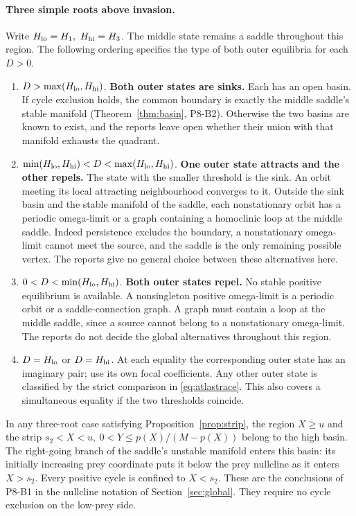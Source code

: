 \documentclass[12pt,a4paper,twoside,fleqn]{article}
\theoremstyle{journal}
\newcommand{\claim}[1]{{\normalfont\bfseries\boldmath #1}}
\begin{document}
\paragraph{Three simple roots above invasion.}
Write \(H_{\rm lo}=H_1,\ H_{\rm hi}=H_3\). The middle state remains a saddle throughout this region. The following ordering specifies the type of both outer equilibria for each \(D>0\).
\begin{enumerate}
\item \(D>\max(H_{\rm lo},H_{\rm hi})\). \claim{Both outer states are sinks.} Each has an open basin. If cycle exclusion holds, the common boundary is exactly the middle saddle's stable manifold (Theorem~\ref{thm:basin}, P8-B2). Otherwise the two basins are known to exist, and the reports leave open whether their union with that manifold exhausts the quadrant.
\item \(\min(H_{\rm lo},H_{\rm hi})<D<\max(H_{\rm lo},H_{\rm hi})\). \claim{One outer state attracts and the other repels.} The state with the smaller threshold is the sink. An orbit meeting its local attracting neighbourhood converges to it. Outside the sink basin and the stable manifold of the saddle, each nonstationary orbit has a periodic omega-limit or a graph containing a homoclinic loop at the middle saddle. Indeed persistence excludes the boundary, a nonstationary omega-limit cannot meet the source, and the saddle is the only remaining possible vertex. The reports give no general choice between these alternatives here.
\item \(0<D<\min(H_{\rm lo},H_{\rm hi})\). \claim{Both outer states repel.} No stable positive equilibrium is available. A nonsingleton positive omega-limit is a periodic orbit or a saddle-connection graph. A graph must contain a loop at the middle saddle, since a source cannot belong to a nonstationary omega-limit. The reports do not decide the global alternatives throughout this region.
\item \(D=H_{\rm lo}\) or \(D=H_{\rm hi}\). At each equality the corresponding outer state has an imaginary pair; use its own focal coefficients. Any other outer state is classified by the strict comparison in \eqref{eq:atlastrace}. This also covers a simultaneous equality if the two thresholds coincide.
\end{enumerate}
In any three-root case satisfying Proposition~\ref{prop:strip}, the region \(X\ge u\) and the strip \(s_2<X<u,\ 0<Y\le p(X)/(M-p(X))\) belong to the high basin. The right-going branch of the saddle's unstable manifold enters this basin: its initially increasing prey coordinate puts it below the prey nullcline as it enters \(X>s_2\). Every positive cycle is confined to \(X<s_2\). These are the conclusions of P8-B1 in the nullcline notation of Section~\ref{sec:global}. They require no cycle exclusion on the low-prey side.
\end{document}
